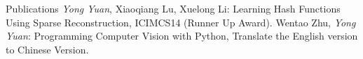 
\begin{rubric}{Publications}
		\emph{Yong Yuan}, Xiaoqiang Lu, Xuelong Li:
		Learning Hash Functions Using Sparse Reconstruction,
		ICIMCS14 (Runner Up Award).
		Wentao Zhu, \emph{Yong Yuan}:
		Programming Computer Vision with Python,
		Translate the English version to Chinese Version.
\end{rubric}

